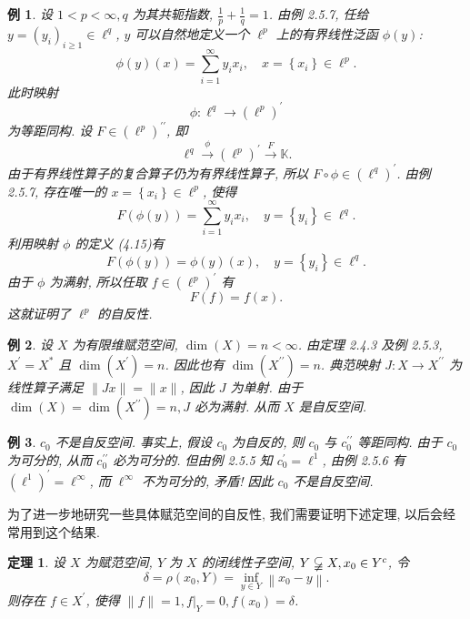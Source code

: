 \documentclass[openany]{ctexbook}
\theoremstyle{kaiti}
\newtheorem{theorem}{定理}[section]
\theoremstyle{normal}
\newtheorem{example}{例}[section]
\begin{document}
\begin{example}
设 $1<p<\infty, q$ 为其共轭指数, $\frac{1}{p}+\frac{1}{q}=1$. 由例 2.5.7, 任给 $y=\left(y_{i}\right)_{i \geqslant 1} \in \ell^{q}$, $y$ 可以自然地定义一个 $\ell^p$ 上的有界线性泛函 $\phi(y)$:
\begin{equation}
  \phi(y)(x)=\sum_{i=1}^{\infty} y_{i} x_{i}, \quad x=\left\{x_{i}\right\} \in \ell^{p}.
\end{equation}
此时映射
$$
\phi: \ell^{q} \rightarrow\left(\ell^{p}\right)^{\prime}
$$
为等距同构. 设 $F \in\left(\ell^{p}\right)^{\prime \prime}$, 即
$$
\ell^{q} \stackrel{\phi}{\longrightarrow}\left(\ell^{p}\right)^{\prime} \stackrel{F}{\longrightarrow} \mathbb{K}.
$$
由于有界线性算子的复合算子仍为有界线性算子, 所以 $F \circ \phi \in\left(\ell^{q}\right)^{\prime}$. 由例 2.5.7, 存在唯一的 $x=\left\{x_{i}\right\} \in \ell^{p}$, 使得
$$
F(\phi(y))=\sum_{i=1}^{\infty} y_{i} x_{i}, \quad y=\left\{y_{i}\right\} \in \ell^{q}.
$$
利用映射 $\phi$ 的定义 (4.15)有
$$
F(\phi(y))=\phi(y)(x), \quad y=\left\{y_{i}\right\} \in \ell^{q}.
$$
由于 $\phi$ 为满射, 所以任取 $f \in\left(\ell^{p}\right)^{\prime}$ 有
$$
F(f)=f(x).
$$
这就证明了 $\ell^{p}$ 的自反性.
\end{example}

\begin{example}
设 $X$ 为有限维赋范空间, $\operatorname{dim}(X)=n<\infty$. 由定理 2.4.3 及例 2.5.3, $X^{\prime}=X^{*}$ 且 $\operatorname{dim}\left(X^{\prime}\right)=n$. 因此也有 $\operatorname{dim}\left(X^{\prime \prime}\right)=n$. 典范映射 $J: X \rightarrow X^{\prime \prime}$ 为线性算子满足 $\|J x\|=\|x\|$, 因此 $J$ 为单射. 由于 $\operatorname{dim}(X)=\operatorname{dim}\left(X^{\prime \prime}\right)=n, J$ 必为满射. 从而 $X$ 是自反空间.
\end{example}

\begin{example}
$c_0$ 不是自反空间. 事实上, 假设 $c_0$ 为自反的, 则 $c_0$ 与 $c_0^{\prime \prime}$ 等距同构. 由于 $c_0$ 为可分的, 从而 $c_0^{\prime \prime}$ 必为可分的. 但由例 2.5.5 知 $c_0^{\prime}=\ell^1$, 由例 2.5.6 有 $\left(\ell^1\right)^{\prime}=\ell^{\infty}$, 而 $\ell^{\infty}$ 不为可分的, 矛盾! 因此 $c_0$ 不是自反空间.
\end{example}

为了进一步地研究一些具体赋范空间的自反性, 我们需要证明下述定理, 以后会经常用到这个结果.

\begin{theorem}
设 $X$ 为赋范空间, $Y$ 为 $X$ 的闭线性子空间, $Y \varsubsetneqq X, x_0 \in Y^{c}$, 令
$$
\delta=\rho\left(x_0, Y\right)=\inf_{y \in Y}\left\|x_0-y\right\|.
$$
则存在 $f \in X^{\prime}$, 使得 $\|f\|=1,\left.f\right|_{Y}=0, f\left(x_0\right)=\delta$.
\end{theorem}
\end{document}

